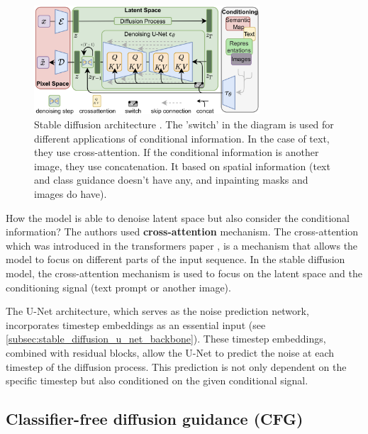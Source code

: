 \begin{figure}
    \centering
    \includegraphics[width=0.75\textwidth]{images/diffusion_models/stable_diffusion/architecture.png}
    \caption{Stable diffusion architecture \cite{stable_diffusion}. The 'switch' in the diagram is used for different applications of conditional information. In the case of text, they use cross-attention. If the conditional information is another image, they use concatenation. It based on spatial information (text and class guidance doesn't have any, and inpainting masks and images do have).}
    \label{fig:stable_diffusion_architecture}
\end{figure}

How the model is able to denoise latent space but also consider the conditional information? The authors used \textbf{cross-attention} mechanism. The cross-attention which was introduced in the transformers paper \cite{transformer}, is a mechanism that allows the model to focus on different parts of the input sequence. In the stable diffusion model, the cross-attention mechanism is used to focus on the latent space and the conditioning signal (text prompt or another image). 

The U-Net architecture, which serves as the noise prediction network, incorporates timestep embeddings as an essential input (see \ref{subsec:stable_diffusion_u_net_backbone}). These timestep embeddings, combined with residual blocks, allow the U-Net to predict the noise at each timestep of the diffusion process. This prediction is not only dependent on the specific timestep but also conditioned on the given conditional signal. 











\subsection{Classifier-free diffusion guidance (CFG)}

